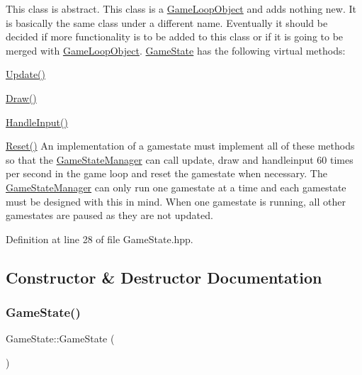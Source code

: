 This class is abstract. This class is a \hyperlink{class_game_loop_object}{Game\+Loop\+Object} and adds nothing new. It is basically the same class under a different name. Eventually it should be decided if more functionality is to be added to this class or if it is going to be merged with \hyperlink{class_game_loop_object}{Game\+Loop\+Object}. \hyperlink{class_game_state}{Game\+State} has the following virtual methods\+:
\begin{DoxyItemize}
\item \hyperlink{class_game_state_a5be51b634f95bc6e57066ad6931aa18b}{Update()}
\item \hyperlink{class_game_state_a8741c5c696c6c366beb4b845c08c3cf8}{Draw()}
\item \hyperlink{class_game_state_a8bce2828cee99ae7c07322804531fd01}{Handle\+Input()}
\item \hyperlink{class_game_state_a46ac6317883dff0eba4f8f305af6b6bb}{Reset()} An implementation of a gamestate must implement all of these methods so that the \hyperlink{class_game_state_manager}{Game\+State\+Manager} can call update, draw and handleinput 60 times per second in the game loop and reset the gamestate when necessary. The \hyperlink{class_game_state_manager}{Game\+State\+Manager} can only run one gamestate at a time and each gamestate must be designed with this in mind. When one gamestate is running, all other gamestates are paused as they are not updated. 
\end{DoxyItemize}

Definition at line 28 of file Game\+State.\+hpp.



\subsection{Constructor \& Destructor Documentation}
\mbox{\label{class_game_state_a4fa0a2bf50315c4a35a3890a0adcee5c}} 
\subsubsection{\texorpdfstring{Game\+State()}{GameState()}}
{\footnotesize\ttfamily Game\+State\+::\+Game\+State (\begin{DoxyParamCaption}{ }\end{DoxyParamCaption})}



